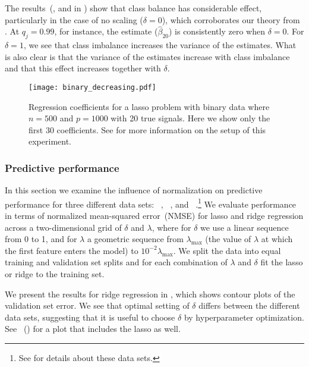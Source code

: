 The results~(, and  in
) show that class balance has considerable effect,
particularly in the case of no scaling (\(\delta = 0\)), which corroborates our theory from
. At \(q_j=0.99\), for instance, the estimate
(\(\hat{\beta}_{20}\)) is consistently zero when \(\delta = 0\). For \(\delta=1\), we see
that class imbalance increases the variance of the estimates. What is also clear is that
the variance of the estimates increase with class imbalance and that this effect increases
together with \(\delta\).

\begin{figure}[htpb]
  \centering
  \texttt{[image: binary\_decreasing.pdf]}
  \caption{%
    Regression coefficients for a lasso problem with binary data where \(n = 500\) and
    \(p = \num{1000}\) with 20 true signals. Here we show only the first 30
    coefficients. See  for more information
    on the setup of this experiment.
  }
  \label{fig:binary-decreasing}
\end{figure}

\subsubsection{Predictive performance}

In this section we examine the influence of normalization on predictive performance for
three different data sets: ~\citep{becker1996}, ~\citep{rhee2006},
and ~\citep{platt1998}.\footnote{See  for details about
  these data sets.} We evaluate performance in terms of normalized mean-squared error~(NMSE)
for lasso and ridge regression across a two-dimensional grid of \(\delta\) and \(\lambda\),
where for \(\delta\) we use a linear sequence from 0 to 1, and for \(\lambda\) a geometric
sequence from \(\lambda_\text{max}\) (the value of \(\lambda\) at which the first feature
enters the model) to \(10^{-2}\lambda_\text{max}\). We split the data into equal training
and validation set splits and for each combination of \(\lambda\) and \(\delta\) fit the
lasso or ridge to the training set.

We present the results for ridge regression in , which shows
contour plots of the validation set error. We see that optimal setting of \(\delta\)
differs between the different data sets, suggesting that it is useful to choose \(\delta\)
by hyperparameter optimization. See
~() for a plot
that includes the lasso as well.

